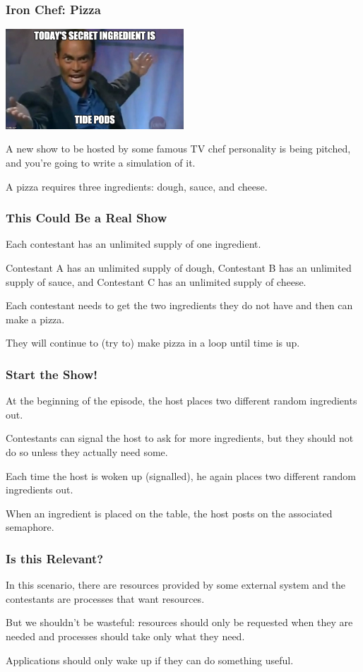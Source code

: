 \begin{frame}
	\frametitle{Iron Chef: Pizza}
	\begin{center}
		\includegraphics[width=0.5\textwidth]{images/ironchef.jpg}
	\end{center}

	A new show to be hosted by some famous TV chef personality is being pitched, and you're going to write a simulation of it.

	A pizza requires three ingredients: dough, sauce, and cheese.

\end{frame}

\begin{frame}
	\frametitle{This Could Be a Real Show}

	Each contestant has an unlimited supply of one ingredient.

	Contestant A has an unlimited supply of dough, Contestant B has an unlimited supply of sauce, and Contestant C has an unlimited supply of cheese.

	Each contestant needs to get the two ingredients they do not have and then can make a pizza.

	They will continue to (try to) make pizza in a loop until time is up.

\end{frame}

\begin{frame}
	\frametitle{Start the Show!}
	At the beginning of the episode, the host places two different random ingredients out.

	Contestants can signal the host to ask for more ingredients, but they should not do so unless they actually need some.

	Each time the host is woken up (signalled), he again places two different random ingredients out.

	When an ingredient is placed on the table, the host posts on the associated semaphore.

\end{frame}

\begin{frame}
	\frametitle{Is this Relevant?}

	In this scenario, there are resources provided by some external system and the contestants are processes that want resources.

	But we shouldn't be wasteful: resources should only be requested when they are needed and processes should take only what they need.

	Applications should only wake up if they can do something useful.

\end{frame}

